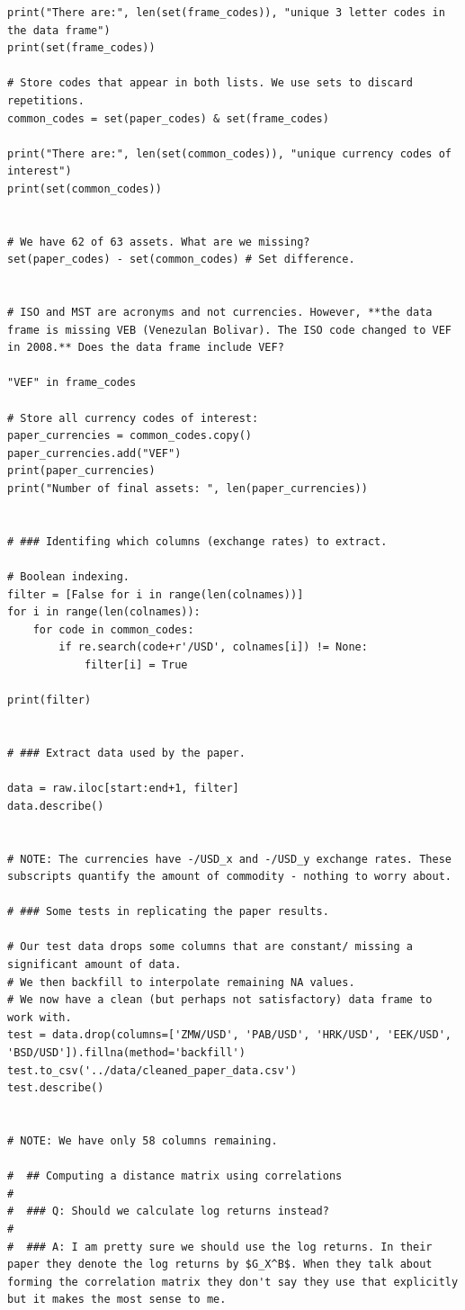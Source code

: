 \documentclass[a4paper]{article}
\begin{document}
\begin{lstlisting}
print("There are:", len(set(frame_codes)), "unique 3 letter codes in the data frame")
print(set(frame_codes))

# Store codes that appear in both lists. We use sets to discard repetitions.
common_codes = set(paper_codes) & set(frame_codes)

print("There are:", len(set(common_codes)), "unique currency codes of interest")
print(set(common_codes))


# We have 62 of 63 assets. What are we missing?
set(paper_codes) - set(common_codes) # Set difference.


# ISO and MST are acronyms and not currencies. However, **the data frame is missing VEB (Venezulan Bolivar). The ISO code changed to VEF in 2008.** Does the data frame include VEF?

"VEF" in frame_codes

# Store all currency codes of interest:
paper_currencies = common_codes.copy()
paper_currencies.add("VEF")
print(paper_currencies)
print("Number of final assets: ", len(paper_currencies))


# ### Identifing which columns (exchange rates) to extract.

# Boolean indexing.
filter = [False for i in range(len(colnames))]
for i in range(len(colnames)):
    for code in common_codes:
        if re.search(code+r'/USD', colnames[i]) != None:
            filter[i] = True

print(filter)


# ### Extract data used by the paper.

data = raw.iloc[start:end+1, filter]
data.describe()


# NOTE: The currencies have -/USD_x and -/USD_y exchange rates. These subscripts quantify the amount of commodity - nothing to worry about.

# ### Some tests in replicating the paper results.

# Our test data drops some columns that are constant/ missing a significant amount of data.
# We then backfill to interpolate remaining NA values.
# We now have a clean (but perhaps not satisfactory) data frame to work with.
test = data.drop(columns=['ZMW/USD', 'PAB/USD', 'HRK/USD', 'EEK/USD', 'BSD/USD']).fillna(method='backfill')
test.to_csv('../data/cleaned_paper_data.csv')
test.describe()


# NOTE: We have only 58 columns remaining.

#  ## Computing a distance matrix using correlations
#
#  ### Q: Should we calculate log returns instead?
#
#  ### A: I am pretty sure we should use the log returns. In their paper they denote the log returns by $G_X^B$. When they talk about forming the correlation matrix they don't say they use that explicitly but it makes the most sense to me.


\end{lstlisting}
\end{document}
